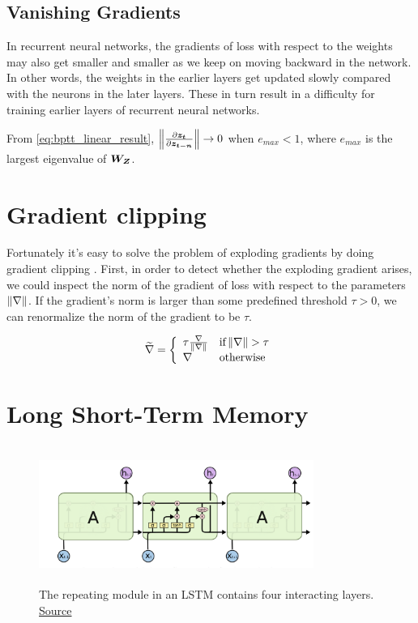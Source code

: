 \subsection{Vanishing Gradients}
In recurrent neural networks, the gradients of loss with respect to the weights may also get smaller and smaller as we keep on moving backward in the network. 
In other words, the weights in the earlier layers get updated slowly compared with the neurons in the later layers.
These in turn result in a difficulty for training earlier layers of recurrent neural networks.

From \cref{eq:bptt_linear_result}, $\norm{\frac{\partial \vect{z_t}}{\partial \vect{z_{t-n}}}} \rightarrow 0$ when $e_{max} < 1$, where $e_{max}$ is the largest eigenvalue of $\matr{W_Z}$.

\section{Gradient clipping}
Fortunately it's easy to solve the problem of exploding gradients by doing gradient clipping \cite{1211.5063}.
First, in order to detect whether the exploding gradient arises, we could inspect the norm of the gradient of loss with respect to the parameters $\norm{\nabla}$.
If the gradient's norm is larger than some predefined threshold $\tau > 0$, we can renormalize the norm of the gradient to be $\tau$.

\[
\widetilde{\nabla}=\left\{
            \begin{array}{ll}
              \tau\frac{\nabla}{\norm{\nabla}} & \text{if}  \norm{\nabla}>\tau\\
              \nabla & \text{otherwise}
            \end{array}
          \right.
\]

\section{Long Short-Term Memory}


\begin{figure}[h]
  \centering
      \includegraphics[width=0.8\textwidth,height=4.5cm]{lectures/06-b/image/lstm.png}
          \caption{
            The repeating module in an LSTM contains four interacting layers.
            \href{http://colah.github.io/posts/2015-08-Understanding-LSTMs/}{Source}
          }
          \label{fig:lstm}
\end{figure}

